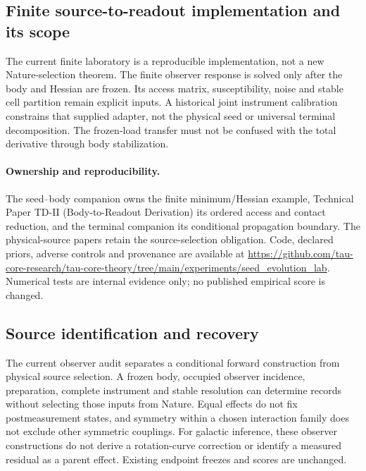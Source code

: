 \documentclass[11pt]{article}
\begin{document}
\subsection{Finite source-to-readout implementation and its scope}
The current finite laboratory is a reproducible implementation, not a new Nature-selection theorem. The finite observer response is solved only after the body and Hessian are frozen. Its access matrix, susceptibility, noise and stable cell partition remain explicit inputs. A historical joint instrument calibration constrains that supplied adapter, not the physical seed or universal terminal decomposition. The frozen-load transfer must not be confused with the total derivative through body stabilization.
\paragraph{Ownership and reproducibility.}
The seed--body companion owns the finite minimum/Hessian example, Technical Paper TD-II (Body-to-Readout Derivation) its ordered access and contact reduction, and the terminal companion its conditional propagation boundary. The physical-source papers retain the source-selection obligation. Code, declared priors, adverse controls and provenance are available at \url{https://github.com/tau-core-research/tau-core-theory/tree/main/experiments/seed_evolution_lab}. Numerical tests are internal evidence only; no published empirical score is changed.

\subsection{Source identification and recovery}
The current observer audit separates a conditional forward construction from physical source selection. A frozen body, occupied observer incidence, preparation, complete instrument and stable resolution can determine records without selecting those inputs from Nature. Equal effects do not fix postmeasurement states, and symmetry within a chosen interaction family does not exclude other symmetric couplings. For galactic inference, these observer constructions do not derive a rotation-curve correction or identify a measured residual as a parent effect. Existing endpoint freezes and scores are unchanged.
\end{document}
